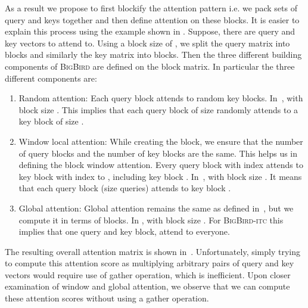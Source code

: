 \documentclass{article}
\newcommand{\bigb}{\textsc{BigBird}\xspace}
\begin{document}
As a result we propose to first blockify the attention pattern i.e. we pack sets of query and keys together and then define attention on these blocks. 
It is easier to explain this process using the example 
shown in . Suppose, there are  query and  key vectors to attend to. Using a block size of , we split the query matrix into  blocks and similarly the key matrix into  blocks. Then the three different building components of \bigb are defined on the block matrix. In particular the three different components are:
\begin{enumerate}
    \item Random attention: Each query block attends to  random key blocks. In~,  with block size . This implies that each query block of size  randomly attends to a key block of size . 
    \item Window local attention: While creating the block, we ensure that the number of query blocks and the number of key blocks are the same. This helps us in defining the block window attention. Every query block with index  attends to key block with index  to , including key block . In~,  with block size . It means that each query block  (size  queries) attends to key block .
    \item Global attention: Global attention remains the same as defined in~, but we compute it in terms of blocks. In ,  with block size . For \bigb-\textsc{itc} this implies that one query and key block, attend to everyone. 
\end{enumerate}
The resulting overall attention matrix is shown in~.
Unfortunately, simply trying to compute this attention score as multiplying arbitrary pairs of query and key vectors would require use of gather operation, which is inefficient. 
Upon closer examination of window and global attention, we observe that we can compute these attention scores without using a gather operation. 
\end{document}
